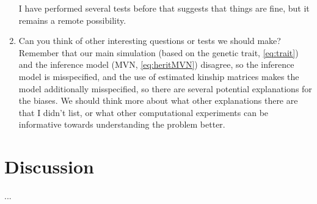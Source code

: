 \documentclass[11pt]{article}
\begin{document}
\begin{enumerate}
  I have performed several tests before that suggests that things are fine, but it remains a remote possibility.
\item Can you think of other interesting questions or tests we should make?
  Remember that our main simulation (based on the genetic trait, \cref{eq:trait}) and the inference model (MVN, \cref{eq:heritMVN}) disagree, so the inference model is misspecified, and the use of estimated kinship matrices makes the model additionally misspecified, so there are several potential explanations for the biases.
  We should think more about what other explanations there are that I didn't list, or what other computational experiments can be informative towards understanding the problem better.
\end{enumerate}

\section{Discussion}

...

\printbibliography
\end{document}
